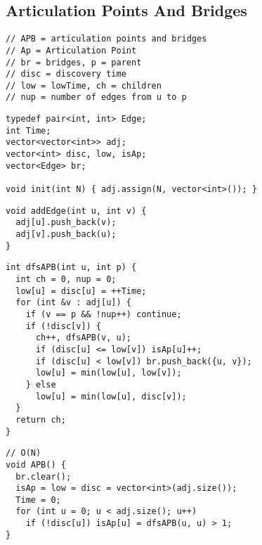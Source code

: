 \documentclass[twoside]{article}
\begin{document}
\begin{multicols*}{2}
\subsectionfont{\large\bfseries\sffamily\underline}
\subsection*{Articulation Points And Bridges}
\begin{verbatim}
// APB = articulation points and bridges
// Ap = Articulation Point
// br = bridges, p = parent
// disc = discovery time
// low = lowTime, ch = children
// nup = number of edges from u to p
\end{verbatim}
\vspace{-12pt}
\begin{verbatim}
typedef pair<int, int> Edge;
int Time;
vector<vector<int>> adj;
vector<int> disc, low, isAp;
vector<Edge> br;

void init(int N) { adj.assign(N, vector<int>()); }
\end{verbatim}
\vspace{-12pt}
\begin{verbatim}
void addEdge(int u, int v) {
  adj[u].push_back(v);
  adj[v].push_back(u);
}
\end{verbatim}
\vspace{-12pt}
\begin{verbatim}
int dfsAPB(int u, int p) {
  int ch = 0, nup = 0;
  low[u] = disc[u] = ++Time;
  for (int &v : adj[u]) {
    if (v == p && !nup++) continue;
    if (!disc[v]) {
      ch++, dfsAPB(v, u);
      if (disc[u] <= low[v]) isAp[u]++;
      if (disc[u] < low[v]) br.push_back({u, v});
      low[u] = min(low[u], low[v]);
    } else
      low[u] = min(low[u], disc[v]);
  }
  return ch;
}
\end{verbatim}
\vspace{-12pt}
\begin{verbatim}
// O(N)
void APB() {
  br.clear();
  isAp = low = disc = vector<int>(adj.size());
  Time = 0;
  for (int u = 0; u < adj.size(); u++)
    if (!disc[u]) isAp[u] = dfsAPB(u, u) > 1;
}
\end{verbatim}

\subsectionfont{\large\bfseries\sffamily\underline}

\end{multicols*}
\end{document}
